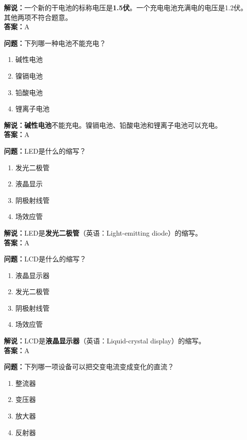 \textbf{解说：}一个新的干电池的标称电压是\textbf{1.5伏}。一个充电电池充满电的电压是1.2伏。其他两项不符合题意。\\\textbf{答案：}A%


\textbf{问题：}下列哪一种电池不能充电？

\begin{enumerate}[label=\Alph*), leftmargin=1cm]
	\item 碱性电池
	\item 镍镉电池
	\item 铅酸电池
	\item 锂离子电池
\end{enumerate}

\textbf{解说：碱性电池}不能充电。镍镉电池、铅酸电池和锂离子电池可以充电。\\\textbf{答案：}A

\textbf{问题：}LED是什么的缩写？

\begin{enumerate}[label=\Alph*), leftmargin=1cm]
	\item 发光二极管
	\item 液晶显示
	\item 阴极射线管
	\item 场效应管
\end{enumerate}

\textbf{解说：}LED是\textbf{发光二极管}（英语：Light-emitting diode）的缩写。\\\textbf{答案：}A%


\textbf{问题：}LCD是什么的缩写？

\begin{enumerate}[label=\Alph*), leftmargin=1cm]
	\item 液晶显示器
	\item 发光二极管
	\item 阴极射线管
	\item 场效应管
\end{enumerate}

\textbf{解说：}LCD是\textbf{液晶显示器}（英语：Liquid-crystal display）的缩写。\\\textbf{答案：}A%


\textbf{问题：}下列哪一项设备可以把交变电流变成变化的直流？

\begin{enumerate}[label=\Alph*), leftmargin=1cm]
	\item 整流器
	\item 变压器
	\item 放大器
	\item 反射器
\end{enumerate}

